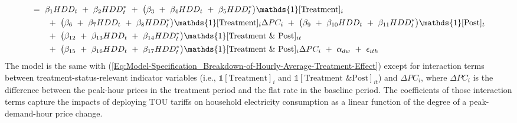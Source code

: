 \begin{equation}
\begin{split}
    & = \ \beta_{1} HDD_{t} \ + \ \beta_{2} HDD_{t}^{*} \ + \ \big( \beta_{3} \ + \ \beta_{4} HDD_{t} \ + \ \beta_{5} HDD_{t}^{*} \big) \mathds{1}[\text{Treatment}]_{i} \\
    & \hspace{0.7cm} + \ \big( \beta_{6} \ + \ \beta_{7} HDD_{t} \ + \ \beta_{8} HDD_{t}^{*} \big) \mathds{1}[\text{Treatment}]_{i} \Delta PC_{i} \ + \ \big( \beta_{9} \ + \ \beta_{10} HDD_{t} \ + \ \beta_{11} HDD_{t}^{*} \big) \mathds{1}[\text{Post}]_{t} \\
    & \hspace{0.7cm} + \ \big( \beta_{12} \ + \ \beta_{13} HDD_{t} \ + \ \beta_{14} HDD_{t}^{*} \big) \mathds{1}[\text{Treatment \& Post}]_{it} \\
    & \hspace{0.7cm} + \ \big( \beta_{15} \ + \ \beta_{16} HDD_{t} \ + \ \beta_{17} HDD_{t}^{*} \big) \mathds{1}[\text{Treatment \& Post}]_{i} \Delta PC_{i} \ + \ \alpha_{dw} \ + \ \epsilon_{ith}
\end{split}
\end{equation}
The model is the same with (\ref{Eq:Model-Specification_Breakdown-of-Hourly-Average-Treatment-Effect}) except for interaction terms between treatment-status-relevant indicator variables (i.e., $\mathds{1}[\text{Treatment}]_{i}$ and $\mathds{1}[\text{Treatment \& Post}]_{it}$) and $\Delta PC_{i}$, where $\Delta PC_{i}$ is the difference between the peak-hour prices in the treatment period and the flat rate in the baseline period. The coefficients of those interaction terms capture the impacts of deploying TOU tariffs on household electricity consumption as a linear function of the degree of a peak-demand-hour price change.

